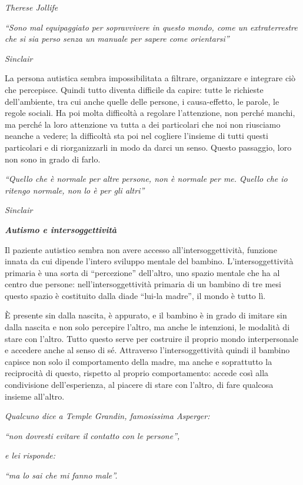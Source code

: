\documentclass[]{article}
\begin{document}
\emph{Therese Jollife}

\emph{``Sono mal equipaggiato per sopravvivere in questo mondo, come un
extraterrestre che si sia perso senza un manuale per sapere come
orientarsi'' }

\emph{Sinclair}

La persona autistica sembra impossibilitata a filtrare, organizzare e
integrare ciò che percepisce. Quindi tutto diventa difficile da capire:
tutte le richieste dell'ambiente, tra cui anche quelle delle persone, i
causa-effetto, le parole, le regole sociali. Ha poi molta difficoltà a
regolare l'attenzione, non perché manchi, ma perché la loro attenzione
va tutta a dei particolari che noi non riusciamo neanche a vedere; la
difficoltà sta poi nel cogliere l'insieme di tutti questi particolari e
di riorganizzarli in modo da darci un senso. Questo passaggio, loro non
sono in grado di farlo.

\emph{``Quello che è normale per altre persone, non è normale per me.
Quello che io ritengo normale, non lo è per gli altri'' }

\emph{Sinclair}

\emph{\textbf{Autismo e intersoggettività}}

Il paziente autistico sembra non avere accesso all'intersoggettività,
funzione innata da cui dipende l'intero sviluppo mentale del bambino.
L'intersoggettività primaria è una sorta di ``percezione'' dell'altro,
uno spazio mentale che ha al centro due persone: nell'intersoggettività
primaria di un bambino di tre mesi questo spazio è costituito dalla
diade ``lui-la madre'', il mondo è tutto lì.

È presente sin dalla nascita, è appurato, e il bambino è in grado di
imitare sin dalla nascita e non solo percepire l'altro, ma anche le
intenzioni, le modalità di stare con l'altro. Tutto questo serve per
costruire il proprio mondo interpersonale e accedere anche al senso di
sé. Attraverso l'intersoggettività quindi il bambino capisce non solo il
comportamento della madre, ma anche e soprattutto la reciprocità di
questo, rispetto al proprio comportamento: accede così alla condivisione
dell'esperienza, al piacere di stare con l'altro, di fare qualcosa
insieme all'altro.

\emph{Qualcuno dice a Temple Grandin, famosissima Asperger: }

\emph{``non dovresti evitare il contatto con le persone'', }

\emph{e lei risponde: }

\emph{``ma lo sai che mi fanno male''.}
\end{document}

